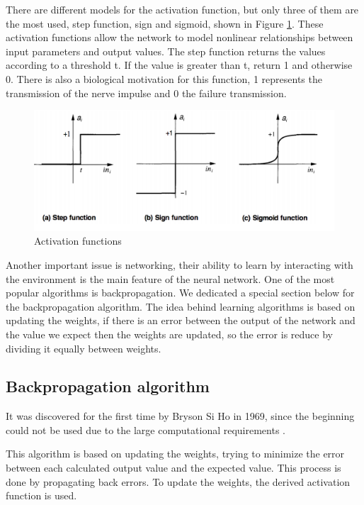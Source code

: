  There are different models for the activation function, but only three of them are the most used, step function,
  sign and sigmoid, shown in Figure \ref{fig:activation-fun}. These activation functions allow the network to model nonlinear relationships between input parameters and output values. The step function returns the values according to a threshold t. If the value is greater than t, return 1 and otherwise 0. There is also a biological motivation for this function, 1 represents the transmission of the nerve impulse and 0 the failure transmission.

\begin{figure}[htbp]
  \centerline{\includegraphics[scale=0.75]{fig/activation-fun.png}}  
  \caption{Activation functions \cite{book.neuronal.network.1995}}
  \label{fig:activation-fun}
\end{figure}
  Another important issue is networking,
   their ability to learn by interacting with the environment is the main feature of the neural network. 
   One of the most popular algorithms is backpropagation. 
   We dedicated a special section below for the backpropagation algorithm. The idea behind learning algorithms is based on updating the weights, 
   if there is an error between the output of the network and the value we expect then the weights are updated, so the error is reduce by dividing it equally between weights.
   
\subsection{Backpropagation algorithm}

It was discovered for the first time by Bryson Si Ho in 1969, 
since the beginning could not be used due to the large computational requirements \cite{book.neuronal.network.1995}.

This algorithm is based on updating the weights, trying to minimize the error between each calculated output value and the expected value. This process is done by propagating back errors.
 To update the weights, the derived activation function is used.

